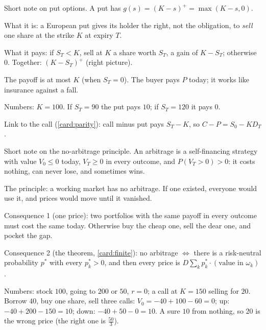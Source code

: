 \begin{problem}[Q2(b)]
Short note on put options.
\cardsays A put has $g(s)=(K-s)^+=\max(K-s,0)$.
\working
\begin{steps}
\item What it is: a European put gives its holder the right, not the obligation, to \emph{sell} one share at the strike $K$ at expiry $T$.
\item What it pays: if $S_T<K$, sell at $K$ a share worth $S_T$, a gain of $K-S_T$; otherwise $0$. Together: $(K-S_T)^+$ (right picture).
\item The payoff is at most $K$ (when $S_T=0$). The buyer pays $P$ today; it works like insurance against a fall.
\item Numbers: $K=100$. If $S_T=90$ the put pays $10$; if $S_T=120$ it pays $0$.
\item Link to the call (\cref{card:parity}): call minus put pays $S_T-K$, so $C-P=S_0-KD_T$.
\end{steps}
\end{problem}

\begin{problem}[Q2(c)]
Short note on the no-arbitrage principle.
\cardsays An arbitrage is a self-financing strategy with value $V_0\le0$ today, $V_T\ge0$ in every outcome, and $P(V_T>0)>0$: it costs nothing, can never lose, and sometimes wins.
\working
\begin{steps}
\item The principle: a working market has no arbitrage. If one existed, everyone would use it, and prices would move until it vanished.
\item Consequence 1 (one price): two portfolios with the same payoff in every outcome must cost the same today. Otherwise buy the cheap one, sell the dear one, and pocket the gap.
\item Consequence 2 (the theorem, \cref{card:finite}): no arbitrage $\iff$ there is a risk-neutral probability $p^*$ with every $p^*_k>0$, and then every price is $D\sum_kp^*_k\cdot(\text{value in }\omega_k)$.
\item Numbers: stock $100$, going to $200$ or $50$, $r=0$; a call at $K=150$ selling for $20$. Borrow $40$, buy one share, sell three calls: $V_0=-40+100-60=0$; up: $-40+200-150=10$; down: $-40+50-0=10$. A sure $10$ from nothing, so $20$ is the wrong price (the right one is $\frac{50}3$).
\end{steps}
\end{problem}

